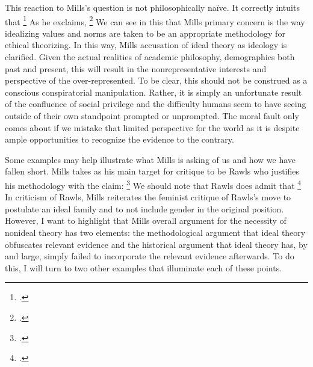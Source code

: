 \documentclass[letterpaper,notitlepage,12pt]{article}
\begin{document}
This reaction to Mills's question is not philosophically na\"{i}ve.
It correctly intuits that \footcite[p.
170]{mills_ideal_2005}
As he exclaims, \footcite[p. 171]{mills_ideal_2005}
We can see in this that Mills primary concern is the way idealizing values and
norms are taken to be an appropriate methodology for ethical theorizing.
In this way, Mills accusation of ideal theory as ideology is clarified.
Given the actual realities of academic philosophy, demographics both past and
present, this will result in the nonrepresentative interests and perspective of
the over-represented.
To be clear, this should not be construed as a conscious conspiratorial
manipulation.
Rather, it is simply an unfortunate result of the confluence of social
privilege and the difficulty humans seem to have seeing outside of their own
standpoint prompted or unprompted.
The moral fault only comes about if we mistake that limited perspective for the
world as it is despite ample opportunities to recognize the evidence to the
contrary.

Some examples may help illustrate what Mills is asking of us and how we have
fallen short.
Mills takes as his main target for critique to be Rawls who justifies his
methodology with the claim: \footcite[p. 8]{
rawls_theory_1999}
We should note that Rawls does admit that \footcite[p.
8]{rawls_theory_1999}
In criticism of Rawls, Mills reiterates the feminist critique of Rawls's move to
postulate an ideal family and to not include gender in the original position.
However, I want to highlight that Mills overall argument for the necessity of
nonideal theory has two elements: the methodological argument that ideal theory
obfuscates relevant evidence and the historical argument that ideal theory has,
by and large, simply failed to incorporate the relevant evidence afterwards.
To do this, I will turn to two other examples that illuminate each of these
points.
\end{document}
